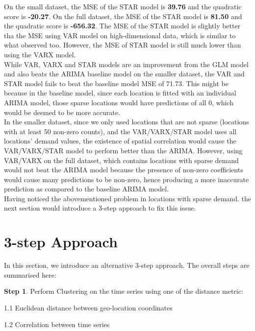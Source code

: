 \documentclass[nonblindrev,msom]{informs3} %
\begin{document}
On the small dataset, the MSE of the STAR model is \textbf{39.76} and the quadratic score is \textbf{-20.27}. On the full dataset, the MSE of the STAR model is \textbf{81.50} and the quadratic score is \textbf{-656.32}. The MSE of the STAR model is slightly better tha the MSE using VAR model on high-dimensional data, which is similar to what \cite{Abolfazl2017} observed too. However, the MSE of STAR model is still much lower than using the VARX model. \\

\noindent While VAR, VARX and STAR models are an improvement from the GLM model and also beats the ARIMA baseline model on the smaller dataset, the VAR and STAR model fails to beat the baseline model MSE of 71.73. This might be because in the baseline model, since each location is fitted with an individual ARIMA model, those sparse locations would have predictions of all 0, which would be deemed to be more accurate. \\

\noindent In the smaller dataset, since we only used locations that are not sparse (locations with at least 50 non-zero counts), and the VAR/VARX/STAR model uses all locations' demand values, the existence of spatial correlation would cause the VAR/VARX/STAR model to perform better than the ARIMA. However, using VAR/VARX on the full dataset, which contains locations with sparse demand would not beat the ARIMA model because the presence of non-zero coefficients would cause many predictions to be non-zero, hence producing a more inaccurate prediction as compared to the baseline ARIMA model. \\

\noindent Having noticed the abovementioned problem in locations with sparse demand. the next section would introduce a 3-step approach to fix this issue. 

\section{3-step Approach}

In this section, we introduce an alternative 3-step approach. The overall steps are summarised here:

\noindent \textbf{Step 1}. Perform Clustering on the time series using one of the distance metric: 

	1.1 Euclidean distance between geo-location coordinates
	
	1.2 Correlation between time series 
	
\end{document}
